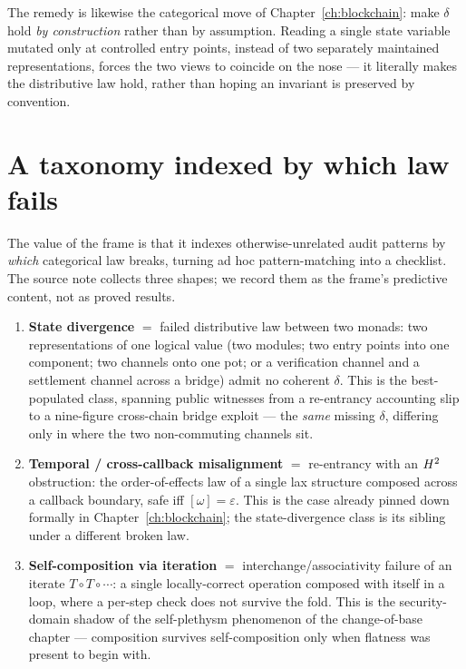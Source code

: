 The remedy is likewise the categorical move of Chapter~\ref{ch:blockchain}: make
$\delta$ hold \emph{by construction} rather than by assumption. Reading a single
state variable mutated only at controlled entry points, instead of two separately
maintained representations, forces the two views to coincide on the nose --- it
literally makes the distributive law hold, rather than hoping an invariant is
preserved by convention.

\section{A taxonomy indexed by which law fails}
\label{sec:security-taxonomy}

The value of the frame is that it indexes otherwise-unrelated audit patterns by
\emph{which} categorical law breaks, turning ad hoc pattern-matching into a
checklist. The source note collects three shapes; we record them as the frame's
predictive content, not as proved results.

\begin{enumerate}[leftmargin=2.2em]
  \item \textbf{State divergence} $=$ failed distributive law between two monads:
        two representations of one logical value (two modules; two entry points
        into one component; two channels onto one pot; or a verification channel
        and a settlement channel across a bridge) admit no coherent $\delta$.
        This is the best-populated class, spanning public witnesses from a
        re-entrancy accounting slip to a nine-figure cross-chain bridge exploit
        --- the \emph{same} missing $\delta$, differing only in where the two
        non-commuting channels sit.
  \item \textbf{Temporal / cross-callback misalignment} $=$ re-entrancy with an
        $H^2$ obstruction: the order-of-effects law of a single lax structure
        composed across a callback boundary, safe iff $[\omega]=\varepsilon$.
        This is the case already pinned down formally in
        Chapter~\ref{ch:blockchain}; the state-divergence class is its sibling
        under a different broken law.
  \item \textbf{Self-composition via iteration} $=$ interchange/associativity
        failure of an iterate $T\circ T\circ\cdots$: a single locally-correct
        operation composed with itself in a loop, where a per-step check does not
        survive the fold. This is the security-domain shadow of the
        self-plethysm phenomenon of the change-of-base chapter --- composition
        survives self-composition only when flatness was present to begin with.
\end{enumerate}


